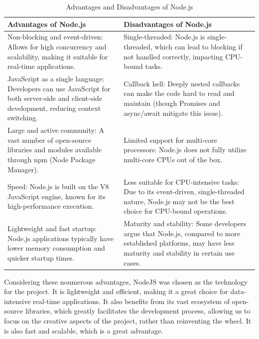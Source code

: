 \begin{table}[H]
    \centering
    \begin{tabularx}{\textwidth}{|X|X|}
        \hline
        \textbf{Advantages of Node.js} & \textbf{Disadvantages of Node.js} \\
        \hline
        Non-blocking and event-driven: Allows for high concurrency and scalability, making it suitable for real-time applications. & Single-threaded: Node.js is single-threaded, which can lead to blocking if not handled correctly, impacting CPU-bound tasks. \\
        \hline
        JavaScript as a single language: Developers can use JavaScript for both server-side and client-side development, reducing context switching. & Callback hell: Deeply nested callbacks can make the code hard to read and maintain (though Promises and async/await mitigate this issue). \\
        \hline
        Large and active community: A vast number of open-source libraries and modules available through npm (Node Package Manager). & Limited support for multi-core processors: Node.js does not fully utilize multi-core CPUs out of the box. \\
        \hline
        Speed: Node.js is built on the V8 JavaScript engine, known for its high-performance execution. & Less suitable for CPU-intensive tasks: Due to its event-driven, single-threaded nature, Node.js may not be the best choice for CPU-bound operations. \\
        \hline
        Lightweight and fast startup: Node.js applications typically have lower memory consumption and quicker startup times. & Maturity and stability: Some developers argue that Node.js, compared to more established platforms, may have less maturity and stability in certain use cases. \\
        \hline
    \end{tabularx}
    \label{tab:node-js-advantages-disadvantages}
    \caption{Advantages and Disadvantages of Node.js}
\end{table}


Considering these noumerous advantages, NodeJS was chosen as the technology for the project. It is lightweight and efficient, making it a great choice for data-intensive real-time applications. It also benefits from its vast ecosystem of open-source libraries, which greatly facilitates the development process, allowing us to focus on the creative aspects of the project, rather than reinventing the wheel. It is also fast and scalable, which is a great advantage.


